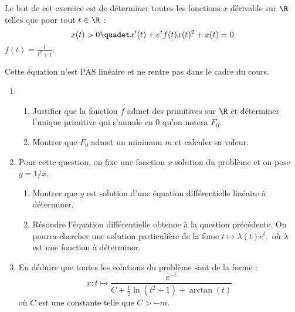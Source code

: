 \documentclass[a4paper, 11pt,reqno]{article}
\begin{document}
\begin{exercice}%
Le but de cet exercice est de déterminer toutes les fonctions $x$ dérivable sur $\R$ telles que pour tout $t\in \R$ : 
$$x(t)>0\quadet x'(t)+e^t f(t)x(t)^2 +x(t) =0$$
 $f(t) =\frac{t}{t^2+1}.$

\warning Cette équation n'est PAS linéaire et ne rentre pas dans le cadre du cours. 
\begin{enumerate}
\item \begin{enumerate}
\item Justifier que la fonction $f$ admet des primitives sur $\R$ et déterminer l'unique primitive qui s'annule en $0$ qu'on notera $F_0$. 
\item Montrer que $F_0$ admet un minimum $m$ et calculer sa valeur. 
\end{enumerate}
\item  Pour cette question, on fixe une fonction $x$ solution du problème et on pose $y=1/x$.
\begin{enumerate}
\item Montrer que $y$ est solution d'une équation différentielle linéaire à déterminer. 
\item Résoudre l'équation différentielle obtenue à la question précédente. On pourra chercher une solution particulière de la fome $t\mapsto \lambda(t) e^{t},  $ où $\lambda$ est une fonction à déterminer. 
\end{enumerate}
\item En déduire que toutes les solutions du problème sont de la forme : 
$$x : t \mapsto \frac{e^{-t}}{ C +\frac{1}{2} \ln(t^2+1) +\arctan(t) }$$
où $C$ est une constante telle que $C>-m$.
\end{enumerate}
\end{exercice}
\end{document}
